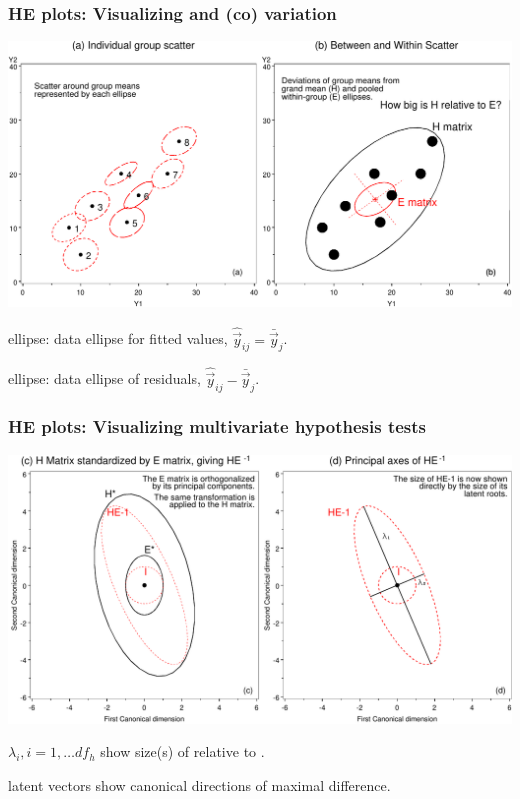 \renewcommand{\FileName}{heplot-ideas}
\begin{frame}
  \frametitle{HE plots: Visualizing  and  (co) variation}

\begin{center}
  \includegraphics[width=.85\textwidth,clip]{fig/arcmanov1}
  \\ 
\end{center}

\begin{itemize*}
  \item {} ellipse:  data ellipse for fitted values, $\hat{\vec{y}}_{ij} =
  \bar{\vec{y}}_j$.
  \item {} ellipse:  data ellipse of residuals, $\hat{\vec{y}}_{ij} -
  \bar{\vec{y}}_j$.
\end{itemize*}
\end{frame}

\begin{frame}
  \frametitle{HE plots: Visualizing multivariate hypothesis tests}
  \begin{center}
	\includegraphics[width=.85\textwidth,clip]{fig/arcmanov2}
	\\ 
  \end{center}
\begin{itemize*}
  \item $\lambda_i, i=1, \dots df_h$ show size(s) of  relative to .
  \item latent vectors show canonical directions of maximal difference.
\end{itemize*}
\end{frame}

